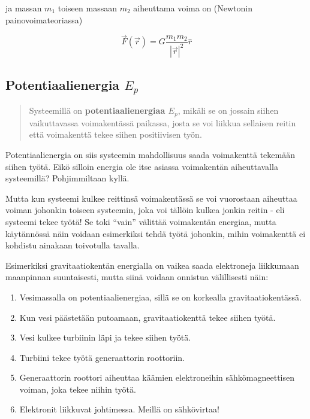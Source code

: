\documentclass[12pt,a4paper,finnish]{book}
\begin{document}
ja massan $m_1$ toiseen massaan $m_2$ aiheuttama voima on (Newtonin painovoimateoriassa)

\begin{equation}
 \vec{F}(\vec{r}) = G\frac{m_1m_2}{|\vec{r}|^2}\hat{r}
\end{equation}

\subsection{Potentiaalienergia $E_p$}

\begin{quotation}
Systeemillä on \textbf{potentiaalienergiaa $E_p$}, mikäli se on jossain siihen vaikuttavassa voimakentässä 
paikassa, josta se voi liikkua sellaisen reitin että voimakenttä tekee siihen positiivisen työn.
\end{quotation}

Potentiaalienergia on siis systeemin mahdollisuus saada voimakenttä tekemään siihen työtä. Eikö silloin 
energia ole itse asiassa voimakentän aiheuttavalla systeemillä? Pohjimmiltaan kyllä.

Mutta kun systeemi kulkee reittinsä voimakentässä se voi vuorostaan aiheuttaa voiman johonkin toiseen 
systeemin, joka voi tällöin kulkea jonkin reitin - eli systeemi tekee työtä! Se toki ``vain'' välittää 
voimakentän energiaa, mutta käytännössä näin voidaan esimerkiksi tehdä työtä johonkin, mihin voimakenttä 
ei kohdistu ainakaan toivotulla tavalla.

Esimerkiksi gravitaatiokentän energialla on vaikea saada elektroneja liikkumaan maanpinnan suuntaisesti, mutta 
siinä voidaan onnistua välillisesti näin:

\begin{enumerate}
 \item Vesimassalla on potentiaalienergiaa, sillä se on korkealla gravitaatiokentässä.
 \item Kun vesi päästetään putoamaan, gravitaatiokenttä tekee siihen työtä.
 \item Vesi kulkee turbiinin läpi ja tekee siihen työtä.
 \item Turbiini tekee työtä generaattorin roottoriin.
 \item Generaattorin roottori aiheuttaa käämien elektroneihin sähkömagneettisen voiman, joka tekee niihin 
 työtä.
 \item Elektronit liikkuvat johtimessa. Meillä on sähkövirtaa!
\end{enumerate}
\end{document}
